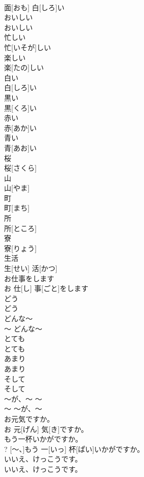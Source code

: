 \documentclass[8pt]{extreport}
\begin{document}
\begin{CJK}{UTF8}{min}
\\	面[おも] 白[しろ]い		
\\	おいしい	
\\	おいしい		
\\	忙しい	
\\	忙[いそが]しい		
\\	楽しい	
\\	楽[たの]しい		
\\	白い	
\\	白[しろ]い		
\\	黒い	
\\	黒[くろ]い		
\\	赤い	
\\	赤[あか]い		
\\	青い	
\\	青[あお]い		
\\	桜	
\\	桜[さくら]		
\\	山	
\\	山[やま]		
\\	町	
\\	町[まち]		
\\	所	
\\	所[ところ]		
\\	寮	
\\	寮[りょう]		
\\	生活	
\\	生[せい] 活[かつ]		
\\	お仕事をします	
\\	お 仕[し] 事[ごと]をします		
\\	どう	
\\	どう		
\\	どんな〜	
\\	〜	どんな〜		
\\	とても	
\\	とても		
\\	あまり	
\\	あまり		
\\	そして	
\\	そして		
\\	〜が、〜	〜
\\	〜	〜が、〜		
\\	お元気ですか。	
\\	お 元[げん] 気[き]ですか。		
\\	[〜、]もう一杯いかがですか。	
\\	[〜]?	[〜、]もう 一[いっ] 杯[ぱい]いかがですか。		
\\	いいえ、けっこうです。	
\\	いいえ、けっこうです。		

\end{CJK}
\end{document}
